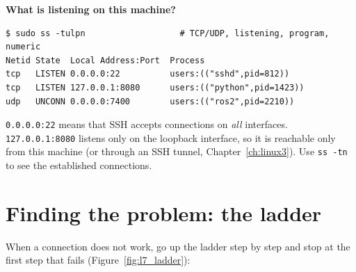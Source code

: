 \textbf{What is listening on this machine?}
\begin{verbatim}
$ sudo ss -tulpn                   # TCP/UDP, listening, program, numeric
Netid State  Local Address:Port  Process
tcp   LISTEN 0.0.0.0:22          users:(("sshd",pid=812))
tcp   LISTEN 127.0.0.1:8080      users:(("python",pid=1423))
udp   UNCONN 0.0.0.0:7400        users:(("ros2",pid=2210))
\end{verbatim}
\texttt{0.0.0.0:22} means that SSH accepts connections on \emph{all} interfaces. \texttt{127.0.0.1:8080} listens only on the loopback interface, so it is reachable only from this machine (or through an SSH tunnel, Chapter~\ref{ch:linux3}). Use \texttt{ss -tn} to see the established connections.

\section*{Finding the problem: the ladder}
When a connection does not work, go up the ladder step by step and stop at the first step that fails (Figure~\ref{fig:l7_ladder}):

